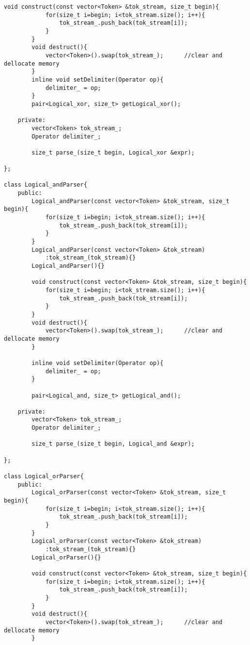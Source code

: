 \documentclass[pdftex,12pt,letterpaper,notitlepage,twoside]{article}
\begin{document}
\begin{lstlisting}[frame=single,caption={C program for testing}]
        void construct(const vector<Token> &tok_stream, size_t begin){
            for(size_t i=begin; i<tok_stream.size(); i++){
                tok_stream_.push_back(tok_stream[i]);
            }
        }
        void destruct(){
            vector<Token>().swap(tok_stream_);      //clear and dellocate memory
        }
        inline void setDelimiter(Operator op){
            delimiter_ = op;
        }
        pair<Logical_xor, size_t> getLogical_xor();

    private:
        vector<Token> tok_stream_;
        Operator delimiter_;
        
        size_t parse_(size_t begin, Logical_xor &expr);

};

class Logical_andParser{
    public:
        Logical_andParser(const vector<Token> &tok_stream, size_t begin){
            for(size_t i=begin; i<tok_stream.size(); i++){
                tok_stream_.push_back(tok_stream[i]);
            }
        }
        Logical_andParser(const vector<Token> &tok_stream)
            :tok_stream_(tok_stream){}
        Logical_andParser(){}

        void construct(const vector<Token> &tok_stream, size_t begin){
            for(size_t i=begin; i<tok_stream.size(); i++){
                tok_stream_.push_back(tok_stream[i]);
            }
        }
        void destruct(){
            vector<Token>().swap(tok_stream_);      //clear and dellocate memory
        }
        
        inline void setDelimiter(Operator op){
            delimiter_ = op;
        }
        
        pair<Logical_and, size_t> getLogical_and();

    private:
        vector<Token> tok_stream_;
        Operator delimiter_;
        
        size_t parse_(size_t begin, Logical_and &expr);

};

class Logical_orParser{
    public:
        Logical_orParser(const vector<Token> &tok_stream, size_t begin){
            for(size_t i=begin; i<tok_stream.size(); i++){
                tok_stream_.push_back(tok_stream[i]);
            }
        }
        Logical_orParser(const vector<Token> &tok_stream)
            :tok_stream_(tok_stream){}
        Logical_orParser(){}

        void construct(const vector<Token> &tok_stream, size_t begin){
            for(size_t i=begin; i<tok_stream.size(); i++){
                tok_stream_.push_back(tok_stream[i]);
            }
        }
        void destruct(){
            vector<Token>().swap(tok_stream_);      //clear and dellocate memory
        }


\end{lstlisting}
\end{document}
